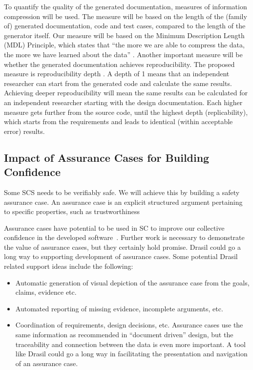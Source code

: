 \documentclass[12pt]{article}
\begin{document}
To quantify the quality of the generated documentation, measures of information
compression will be used.  The measure will be based on the length of the
(family of) generated documentation, code and test cases, compared to the length
of the generator itself.  Our measure will be based on the Minimum Description
Length (MDL) Principle, which states that ``the more we are able to compress the
data, the more we have learned about the data'' \citep{Grunwald2004}.  Another
important measure will be whether the generated documentation achieves
reproducibility. The proposed measure is reproducibility depth
\citep{Soergel2014}.  A depth of 1 means that an independent researcher can
start from the generated code and calculate the same results.  Achieving deeper
reproducibility will mean the same results can be calculated for an independent
researcher starting with the design documentation.  Each higher measure gets
further from the source code, until the highest depth (replicability), which
starts from the requirements and leads to identical (within acceptable error)
results.

\subsection{Impact of Assurance Cases for Building Confidence} \label{SecAssuranceCase}

Some SCS needs to be verifiably safe.  We will achieve this by building a safety
assurance case. An assurance case is an explicit structured argument pertaining
to specific properties, such as trustworthiness

Assurance cases have potential to be used in SC to improve our collective
confidence in the developed software~\cite{SmithEtAl2018_ICSEPoster}.  Further
work is necessary to demonstrate the value of assurance cases, but they
certainly hold promise.  Drasil could go a long way to supporting development of
assurance cases.  Some potential Drasil related support ideas include the
following:

\begin{itemize}
\item Automatic generation of visual depiction of the assurance case from the
  goals, claims, evidence etc.
\item Automated reporting of missing evidence, incomplete arguments, etc.
\item Coordination of requirements, design decisions, etc.  Assurance cases use
  the same information as recommended in ``document driven'' design, but the
  traceability and connection between the data is even more important.  A tool
  like Drasil could go a long way in facilitating the presentation and
  navigation of an assurance case.
\end{itemize}
\end{document}
